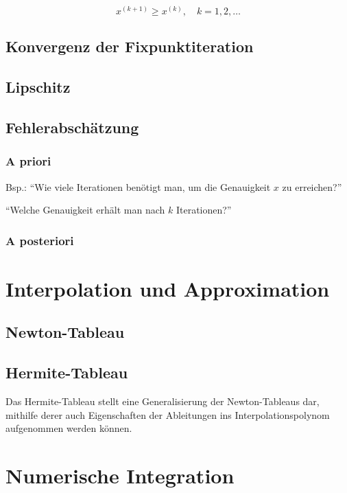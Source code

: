 \documentclass[a4paper, twoside]{article}
\begin{document}
\[x^{(k+1)} \geq x^{(k)},\quad k = 1, 2, \ldots\]

\subsection{Konvergenz der Fixpunktiteration}

\subsection{Lipschitz}

\subsection{Fehlerabschätzung}

\subsubsection{A priori}

Bsp.: \enquote{Wie viele Iterationen benötigt man, um die Genauigkeit \(x\) zu erreichen?}

\enquote{Welche Genauigkeit erhält man nach \(k\) Iterationen?}

\subsubsection{A posteriori}

\section{Interpolation und Approximation}

\subsection{Newton-Tableau}

\subsection{Hermite-Tableau}

Das Hermite-Tableau stellt eine Generalisierung der Newton-Tableaus dar, mithilfe derer auch Eigenschaften der Ableitungen ins Interpolationspolynom aufgenommen werden können.

\section{Numerische Integration}
\end{document}
